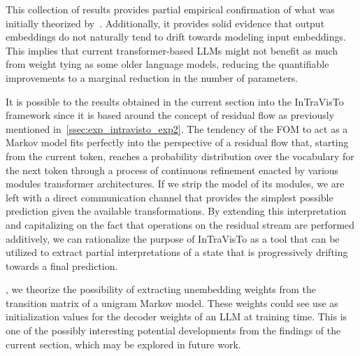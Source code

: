 This collection of results provides partial empirical confirmation of what was initially theorized by~\citet{elhage2021}.
Additionally, it provides solid evidence that output embeddings do not naturally tend to drift towards modeling input embeddings.
This implies that current transformer-based LLMs might not benefit as much from weight tying as some older language models, reducing the quantifiable improvements to a marginal reduction in the number of parameters.

It is possible to  the results obtained in the current section into the InTraVisTo framework since it is based around the concept of residual flow as previously mentioned in~\cref{ssec:exp_intravisto_exp2}.
The tendency of the FOM to act as a Markov model fits perfectly into the perspective of a residual flow that, starting from the current token, reaches a probability distribution over the vocabulary for the next token through a process of continuous refinement enacted by various modules  transformer architectures.
If we strip the model of its modules, we are left with a direct communication channel that provides the simplest possible prediction given the available transformations.
By extending this interpretation and capitalizing on the fact that operations on the residual stream are performed additively, we can rationalize the purpose of InTraVisTo as a tool that can be utilized to extract partial interpretations of a state that is progressively drifting towards a final prediction.

, we theorize the possibility of extracting unembedding weights from the transition matrix of a unigram Markov model.
These weights could see use as initialization values for the decoder weights of an LLM at training time.
This is one of the possibly interesting potential developments  from the findings of the current section, which may be explored in future work.

